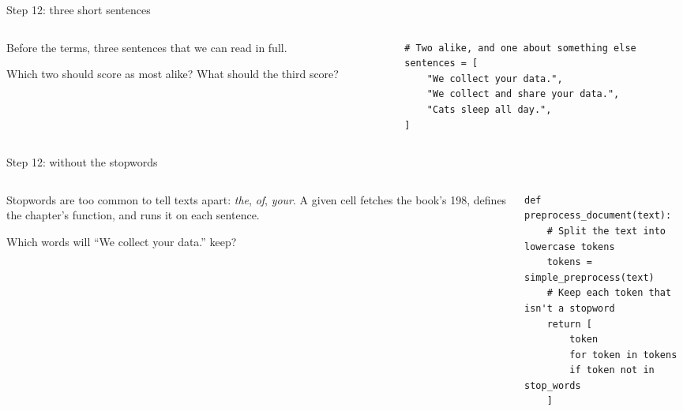 \documentclass[9pt,aspectratio=169]{beamer}
\begin{document}
\begin{frame}[fragile]{Step 12: three short sentences}
    \begin{columns}[T]
        \begin{column}{0.37\textwidth}
            Before the terms, three sentences that we can read in full.

            \medskip
            Which two should score as most alike? What should the third score?
        \end{column}
        \begin{column}{0.6\textwidth}
\begin{lstlisting}
# Two alike, and one about something else
sentences = [
    "We collect your data.",
    "We collect and share your data.",
    "Cats sleep all day.",
]
\end{lstlisting}
        \end{column}
    \end{columns}
\end{frame}

\begin{frame}[fragile]{Step 12: without the stopwords}
    \begin{columns}[T]
        \begin{column}{0.37\textwidth}
            Stopwords are too common to tell texts apart: \textit{the}, \textit{of}, \textit{your}. A given cell fetches the book's 198, defines the chapter's function, and runs it on each sentence.

            \medskip
            Which words will ``We collect your data.'' keep?
        \end{column}
        \begin{column}{0.6\textwidth}
\begin{lstlisting}
def preprocess_document(text):
    # Split the text into lowercase tokens
    tokens = simple_preprocess(text)
    # Keep each token that isn't a stopword
    return [
        token
        for token in tokens
        if token not in stop_words
    ]
\end{lstlisting}
        \end{column}
    \end{columns}
\end{frame}
\end{document}
